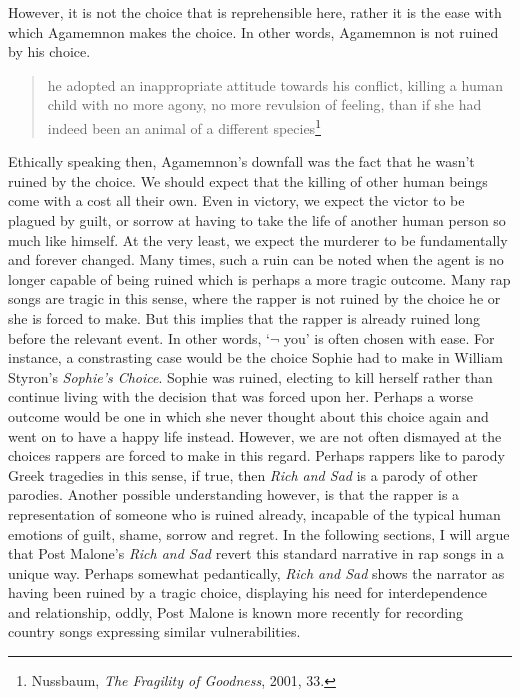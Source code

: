 \documentclass[
  12pt,
]{book}
\theoremstyle{definition}
\theoremstyle{definition}
\theoremstyle{definition}
\theoremstyle{definition}
\theoremstyle{remark}
\begin{document}
However, it is not the choice that is reprehensible here, rather it is the ease with which Agamemnon makes the choice. In other words, Agamemnon is not ruined by his choice.

\begin{quote}
he adopted an inappropriate attitude towards his conflict, killing a human child with no more agony, no more revulsion of feeling, than if she had indeed been an animal of a different species\footnote{Nussbaum, \emph{The {Fragility} of {Goodness}}, 2001, 33.}
\end{quote}

Ethically speaking then, Agamemnon's downfall was the fact that he wasn't ruined by the choice. We should expect that the killing of other human beings come with a cost all their own. Even in victory, we expect the victor to be plagued by guilt, or sorrow at having to take the life of another human person so much like himself. At the very least, we expect the murderer to be fundamentally and forever changed. Many times, such a ruin can be noted when the agent is no longer capable of being ruined which is perhaps a more tragic outcome. Many rap songs are tragic in this sense, where the rapper is not ruined by the choice he or she is forced to make. But this implies that the rapper is already ruined long before the relevant event. In other words, `\(\lnot\) you' is often chosen with ease. For instance, a constrasting case would be the choice Sophie had to make in William Styron's \emph{Sophie's Choice}. Sophie was ruined, electing to kill herself rather than continue living with the decision that was forced upon her. Perhaps a worse outcome would be one in which she never thought about this choice again and went on to have a happy life instead. However, we are not often dismayed at the choices rappers are forced to make in this regard. Perhaps rappers like to parody Greek tragedies in this sense, if true, then \emph{Rich and Sad} is a parody of other parodies. Another possible understanding however, is that the rapper is a representation of someone who is ruined already, incapable of the typical human emotions of guilt, shame, sorrow and regret. In the following sections, I will argue that Post Malone's \emph{Rich and Sad} revert this standard narrative in rap songs in a unique way. Perhaps somewhat pedantically, \emph{Rich and Sad} shows the narrator as having been ruined by a tragic choice, displaying his need for interdependence and relationship, oddly, Post Malone is known more recently for recording country songs expressing similar vulnerabilities.
\end{document}
